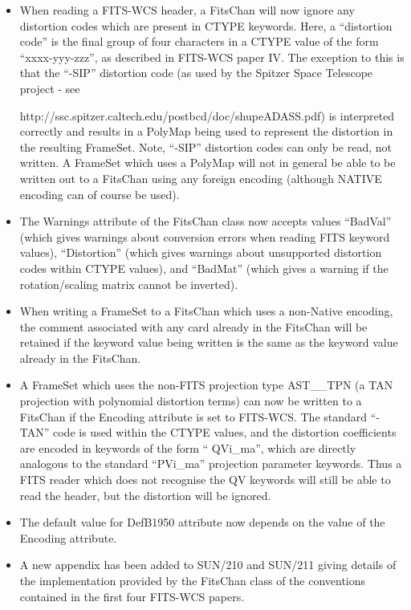 \documentclass[twoside,11pt]{article}
\newcommand{\htmladdnormallink}[2]{#1}
\begin{document}
\begin{enumerate}
\begin{itemize}
\item When reading a FITS-WCS header, a FitsChan will now ignore any
distortion codes which are present in CTYPE keywords. Here, a ``distortion
code'' is the final group of four characters in a CTYPE value of the
form ``xxxx-yyy-zzz'', as described in FITS-WCS paper IV. The exception
to this is that the ``-SIP'' distortion code (as used by the Spitzer
Space Telescope project - see
\htmladdnormallink{
http://ssc.spitzer.caltech.edu/postbcd/doc/shupeADASS.pdf}{
http://ssc.spitzer.caltech.edu/postbcd/doc/shupeADASS.pdf}) is
interpreted correctly and results in a PolyMap being used to represent
the distortion in the resulting FrameSet. Note, ``-SIP'' distortion codes
can only be read, not written. A FrameSet which uses a PolyMap will not
in general be able to be written out to a FitsChan using any foreign
encoding (although NATIVE encoding can of course be used).

\item The Warnings attribute of the FitsChan class now accepts values
``BadVal'' (which gives warnings about conversion errors when reading
FITS keyword values), ``Distortion'' (which gives warnings about
unsupported distortion codes within CTYPE values), and ``BadMat'' (which
gives a warning if the rotation/scaling matrix cannot be inverted).

\item When writing a FrameSet to a FitsChan which uses a non-Native
encoding, the comment associated with any card already in the FitsChan
will be retained if the keyword value being written is the same as the
keyword value already in the FitsChan.

\item A FrameSet which uses the non-FITS projection type AST\_\_TPN (a TAN
projection with polynomial distortion terms) can now be written to a
FitsChan if the Encoding attribute is set to FITS-WCS. The standard
``-TAN'' code is used within the CTYPE values, and the distortion
coefficients are encoded in keywords of the form `` QVi\_ma'', which are
directly analogous to the standard ``PVi\_ma'' projection parameter keywords.
Thus a FITS reader which does not recognise the QV keywords will still
be able to read the header, but the distortion will be ignored.

\item The default value for DefB1950 attribute now depends on the value
of the Encoding attribute.

\item A new appendix has been added to SUN/210 and SUN/211 giving details
of the implementation provided by the FitsChan class of the
conventions contained in the first four FITS-WCS papers.
\end{itemize}


\end{enumerate}
\end{document}
